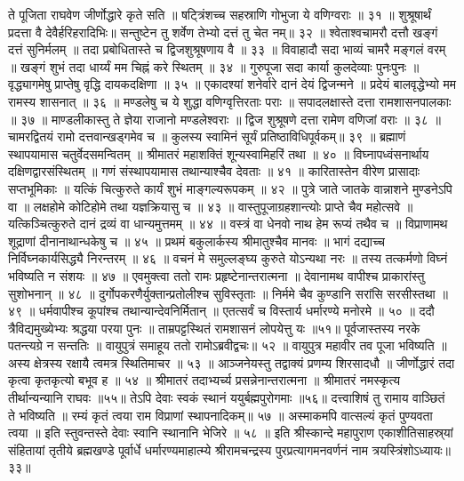 ते पूजिता राघवेण जीर्णोद्धारे कृते सति ॥
षट्त्रिंशच्च सहस्राणि गोभुजा ये वणिग्वराः ॥ ३१ ॥
शुश्रूषार्थं प्रदत्ता वै देवैर्हरिहरादिभिः॥
सन्तुष्टेन तु शर्वेण तेभ्यो दत्तं तु चेत नम्॥ ३२ ॥
श्वेताश्वचामरौ दत्तौ खङ्गं दत्तं सुनिर्मलम् ॥
तदा प्रबोधितास्ते च द्विजशुश्रूषणाय वै ॥ ३३ ॥
विवाहादौ सदा भाव्यं चामरै मङ्गलं वरम् ॥
खङ्गं शुभं तदा धार्य्यं मम चिह्नं करे स्थितम् ॥ ३४ ॥
गुरुपूजा सदा कार्या कुलदेव्याः पुनःपुनः ॥
वृद्ध्यागमेषु प्राप्तेषु वृद्धि दायकदक्षिणा ॥ ३५ ॥
एकादश्यां शनेर्वारे दानं देयं द्विजन्मने ॥
प्रदेयं बालवृद्धेभ्यो मम रामस्य शासनात् ॥ ३६ ॥
मण्डलेषु च ये शुद्धा वणिग्वृत्तिरताः पराः ॥
सपादलक्षास्ते दत्ता रामशासनपालकाः ॥ ३७ ॥
माण्डलीकास्तु ते ज्ञेया राजानो मण्डलेश्वराः ॥
द्विज शुश्रूषणे दत्ता रामेण वणिजां वराः ॥ ३८ ॥
चामरद्वितयं रामो दत्तवान्खड्गमेव च ॥
कुलस्य स्वामिनं सूर्यं प्रतिष्ठाविधिपूर्वकम्॥ ३९ ॥
ब्रह्माणं स्थापयामास चतुर्वेदसमन्वितम् ॥
श्रीमातरं महाशक्तिं शून्यस्वामिहरिं तथा ॥ ४० ॥
विघ्नापध्वंसनार्थाय दक्षिणद्वारसंस्थितम् ॥
गणं संस्थापयामास तथान्याश्चैव देवताः ॥ ४१ ॥
कारितास्तेन वीरेण प्रासादाः सप्तभूमिकाः ॥
यत्किं चित्कुरुते कार्यं शुभं माङ्गल्यरूपकम् ॥ ४२ ॥
पुत्रे जाते जातके वान्नाशने मुण्डनेऽपि वा ॥
लक्षहोमे कोटिहोमे तथा यज्ञक्रियासु च ॥ ४३ ॥
वास्तुपूजाग्रहशान्त्योः प्राप्ते चैव महोत्सवे ॥
यत्किञ्चित्कुरुते दानं द्रव्यं वा धान्यमुत्तमम् ॥ ४४ ॥
वस्त्रं वा धेनवो नाथ हेम रूप्यं तथैव च ॥
विप्राणामथ शूद्राणां दीनानाथान्धकेषु च ॥ ४५ ॥
प्रथमं बकुलार्कस्य श्रीमातुश्चैव मानवः ॥
भागं दद्याच्च निर्विघ्नकार्यसिद्ध्यै निरन्तरम् ॥ ४६ ॥
वचनं मे समुल्लङ्घ्य कुरुते योऽन्यथा नरः ॥
तस्य तत्कर्मणो विघ्नं भविष्यति न संशयः ॥ ४७ ॥
एवमुक्त्वा ततो रामः प्रहृष्टेनान्तरात्मना ॥
देवानामथ वापीश्च प्राकारांस्तु सुशोभनान् ॥ ४८ ॥
दुर्गोपकरणैर्युक्तान्प्रतोलीश्च सुविस्तृताः ॥
निर्ममे चैव कुण्डानि सरांसि सरसीस्तथा ॥ ४९ ॥
धर्मवापीश्च कूपांश्च तथान्यान्देवनिर्मितान् ॥
एतत्सर्वं च विस्तार्य धर्मारण्ये मनोरमे ॥ ५० ॥
ददौ त्रैविद्यमुख्येभ्यः श्रद्धया परया पुनः ॥
ताम्रपट्टस्थितं रामशासनं लोपयेत्तु यः ॥५१॥
पूर्वजास्तस्य नरके पतन्त्यग्रे न सन्ततिः ॥
वायुपुत्रं समाहूय ततो रामोऽब्रवीद्वचः॥ ५२ ॥
वायुपुत्र महावीर तव पूजा भविष्यति ॥
अस्य क्षेत्रस्य रक्षायै त्वमत्र स्थितिमाचर ॥ ५३ ॥
आञ्जनेयस्तु तद्वाक्यं प्रणम्य शिरसादधौ ॥
जीर्णोद्धारं तदा कृत्वा कृतकृत्यो बभूव ह ॥ ५४ ॥
श्रीमातरं तदाभ्यर्च्य प्रसन्नेनान्तरात्मना ॥
श्रीमातरं नमस्कृत्य तीर्थान्यन्यानि राघवः ॥५५॥
तेऽपि देवाः स्वकं स्थानं ययुर्बह्मपुरोगमाः ॥५६॥
दत्त्वाशिषं तु रामाय वाञ्छितं ते भविष्यति ॥
रम्यं कृतं त्वया राम विप्राणां स्थापनादिकम्॥ ५७ ॥
अस्माकमपि वात्सल्यं कृतं पुण्यवता त्वया ॥
इति स्तुवन्तस्ते देवाः स्वानि स्थानानि भेजिरे ॥ ५८ ॥
इति श्रीस्कान्दे महापुराण एकाशीतिसाहस्र्यां संहितायां तृतीये ब्रह्मखण्डे पूर्वार्धे धर्मारण्यमाहात्म्ये श्रीरामचन्द्रस्य पुरप्रत्यागमनवर्णनं नाम त्रयस्त्रिंशोऽध्यायः॥३३॥


